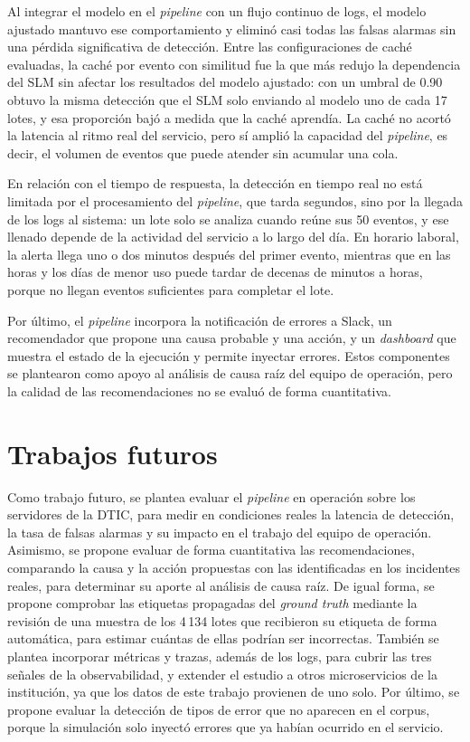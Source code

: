 Al integrar el modelo en el \textit{pipeline} con un flujo continuo de logs, el modelo ajustado mantuvo ese comportamiento y eliminó casi todas las falsas alarmas sin una pérdida significativa de detección. Entre las configuraciones de caché evaluadas, la caché por evento con similitud fue la que más redujo la dependencia del SLM sin afectar los resultados del modelo ajustado: con un umbral de 0.90 obtuvo la misma detección que el SLM solo enviando al modelo uno de cada 17 lotes, y esa proporción bajó a medida que la caché aprendía. La caché no acortó la latencia al ritmo real del servicio, pero sí amplió la capacidad del \textit{pipeline}, es decir, el volumen de eventos que puede atender sin acumular una cola.

En relación con el tiempo de respuesta, la detección en tiempo real no está limitada por el procesamiento del \textit{pipeline}, que tarda segundos, sino por la llegada de los logs al sistema: un lote solo se analiza cuando reúne sus 50 eventos, y ese llenado depende de la actividad del servicio a lo largo del día. En horario laboral, la alerta llega uno o dos minutos después del primer evento, mientras que en las horas y los días de menor uso puede tardar de decenas de minutos a horas, porque no llegan eventos suficientes para completar el lote.

Por último, el \textit{pipeline} incorpora la notificación de errores a Slack, un recomendador que propone una causa probable y una acción, y un \textit{dashboard} que muestra el estado de la ejecución y permite inyectar errores. Estos componentes se plantearon como apoyo al análisis de causa raíz del equipo de operación, pero la calidad de las recomendaciones no se evaluó de forma cuantitativa.

\section{Trabajos futuros}\label{sec:trabajo_futuro}

Como trabajo futuro, se plantea evaluar el \textit{pipeline} en operación sobre los servidores de la DTIC, para medir en condiciones reales la latencia de detección, la tasa de falsas alarmas y su impacto en el trabajo del equipo de operación. Asimismo, se propone evaluar de forma cuantitativa las recomendaciones, comparando la causa y la acción propuestas con las identificadas en los incidentes reales, para determinar su aporte al análisis de causa raíz. De igual forma, se propone comprobar las etiquetas propagadas del \textit{ground truth} mediante la revisión de una muestra de los 4\,134 lotes que recibieron su etiqueta de forma automática, para estimar cuántas de ellas podrían ser incorrectas. También se plantea incorporar métricas y trazas, además de los logs, para cubrir las tres señales de la observabilidad, y extender el estudio a otros microservicios de la institución, ya que los datos de este trabajo provienen de uno solo. Por último, se propone evaluar la detección de tipos de error que no aparecen en el corpus, porque la simulación solo inyectó errores que ya habían ocurrido en el servicio.

